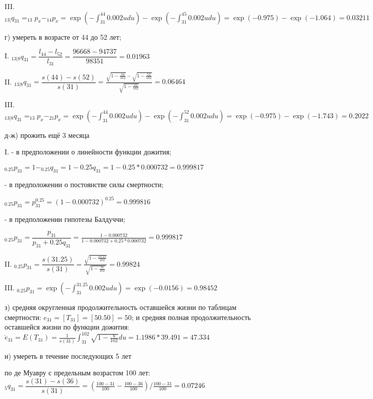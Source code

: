 \documentclass[12pt,a4paper, oneside]{extreport}
\begin{document}
III. $_{13|}q_{31} = _{13}p_x -  _{14}p_x  =  \exp(-\int_{31}^{44} 0.002u  du  ) - \exp(-\int_{31}^{45} 0.002u  du  )  = \exp(-0.975)  - \exp(-1.064) = 0.03211 $  


г) умереть в возрасте от 44 до 52 лет;

I. $_{13|8}q_{31} = \dfrac{l_{44} - l_{52}}{l_{31}} = \dfrac{96668-94737}{98351} = 0.01963$  

II. $_{13|8}q_{31} = \dfrac{s(44) - s(52)}{s(31)} = \frac{\sqrt{1-\frac{44}{102}}-\sqrt{1-\frac{52}{102}}}{\sqrt{1-\frac{31}{102}}} = 0.06464$  


III.  $_{13|8}q_{31} = _{13}p_x -  _{21}p_x  =  \exp(-\int_{31}^{44} 0.002u  du  ) - \exp(-\int_{31}^{52} 0.002u  du  )  = \exp(-0.975)  - \exp(-1.743) = 0.2022 $  



д-ж) прожить ещё 3 месяца 

I. - в предположении о линейности функции дожития;

 $_{0.25}p_{31} = 1 - _{0.25}q_{31} = 1 - 0.25 q_{31} = 1 - 0.25 * 0.000732  = 0.999817$  

- в предположении о постоянстве силы смертности;

 $_{0.25}p_{31} =  p_{31}^{0.25}  = (1-0.000732)^{0.25} = 0.999816$  


- в предположении гипотезы Балдуччи;

$_{0.25}p_{31} =  \dfrac{p_{31}}{p_{31} + 0.25 q_{31} }   =  \frac{1-0.000732}{1-0.000732 + 0.25 * 0.000732 } = 0.999817$  


II.  $_{0.25}p_{31} = \dfrac{s(31.25)}{s(31)} = \frac{\sqrt{1-\frac{31.25}{102}}}{\sqrt{1-\frac{31}{102}}} = 0.99824 $  




III. $_{0.25}p_{31} =  \exp(-\int_{31}^{31.25} 0.002u  du  )  = \exp(-0.0156)  = 0.98452$  




з) средняя округленная продолжительность
оставшейся жизни по таблицам смертности: $ e_{31}  = [T_{31}] = [50.50] = 50  $;
и средняя полная продолжительность
оставшейся жизни по функции дожития:  $\mathring{e}_{31} = E(T_{31}) = \frac{1}{s(31)} \int_{31}^{102} \sqrt{1-\frac{u}{102}}du = 1.1986 * 39.491 = 47.334$


и) умереть в течение последующих 5
лет

по де Муавру с предельным возрастом 100 лет: $_5q_{31}=\dfrac{s(31)-s(36)}{s(31)} = (\frac{100-31}{100} -\frac{100-36}{100})/ \frac{100-31}{100}  = 0.07246$
\end{document}
